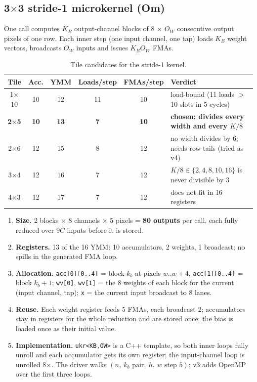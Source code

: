 \documentclass[10pt]{article}
\newcommand{\code}[1]{\texttt{#1}}
\begin{document}
\subsection{3$\times$3 stride-1 microkernel (Om)}
One call computes $K_B$ output-channel blocks of 8 $\times$ $O_W$ consecutive output pixels of one row. Each inner step (one input channel, one tap) loads $K_B$ weight vectors, broadcasts $O_W$ inputs and issues $K_B O_W$ FMAs.
\begin{table}[H]\centering\small
\begin{tabular}{cccccl}
\toprule
Tile & Acc. & YMM & Loads/step & FMAs/step & Verdict\\
\midrule
1$\times$10 & 10 & 12 & 11 & 10 & load-bound (11 loads $>$ 10 slots in 5 cycles)\\
\textbf{2$\times$5} & \textbf{10} & \textbf{13} & \textbf{7} & \textbf{10} & \textbf{chosen: divides every width and every $K/8$}\\
2$\times$6 & 12 & 15 & 8 & 12 & no width divides by 6; needs row tails (tried as v4)\\
3$\times$4 & 12 & 16 & 7 & 12 & $K/8 \in \{2,4,8,10,16\}$ is never divisible by 3\\
4$\times$3 & 12 & 17 & 7 & 12 & does not fit in 16 registers\\
\bottomrule
\end{tabular}
\caption{Tile candidates for the stride-1 kernel.}
\end{table}
\begin{enumerate}[label=(\alph*)]
\item \textbf{Size.} 2 blocks $\times$ 8 channels $\times$ 5 pixels = \textbf{80 outputs} per call, each fully reduced over $9C$ inputs before it is stored.
\item \textbf{Registers.} 13 of the 16 YMM: 10 accumulators, 2 weights, 1 broadcast; no spills in the generated FMA loop.
\item \textbf{Allocation.} \code{acc[0][0..4]} = block $k_b$ at pixels $w..w{+}4$, \code{acc[1][0..4]} = block $k_b{+}1$; \code{wv[0]}, \code{wv[1]} = the 8 weights of each block for the current (input channel, tap); \code{x} = the current input broadcast to 8 lanes.
\item \textbf{Reuse.} Each weight register feeds 5 FMAs, each broadcast 2; accumulators stay in registers for the whole reduction and are stored once; the bias is loaded once as their initial value.
\item \textbf{Implementation.} \code{ukr<KB,OW>} is a C++ template, so both inner loops fully unroll and each accumulator gets its own register; the input-channel loop is unrolled 8$\times$. The driver walks $(n,\ k_b\text{ pair},\ h,\ w\text{ step }5)$; v3 adds OpenMP over the first three loops.
\end{enumerate}
\end{document}
